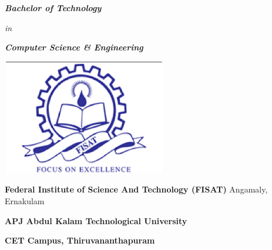 \documentclass[10pt]{article} %
\begin{document}
\noindent 
\vspace{8mm} %
\begin{Center}
       \textbf{\textit{\Large Bachelor of Technology}}\textit{}
\vspace{4mm}


\textit{\normalsize         in}
\vspace{5mm}


\textit{       }\textbf{\textit{\Large Computer Science \& Engineering}}

\vspace{6mm}
\vspace{4mm}
\noindent 



\vspace{8mm}

\includegraphics*[width=2.82in, height=1.98in, keepaspectratio=false, trim=0.00in 0.00in 0.00in 0.02in]{image1}

\vspace{5mm}
\textbf{\Large Federal Institute of Science And Technology (FISAT){\circledR}}
\vspace{4mm}
{\large Angamaly, Ernakulam}

\noindent


\vspace{2mm}

\textbf{\Large APJ Abdul Kalam Technological University}

\noindent \textbf{\Large CET Campus, Thiruvananthapuram}

\textbf{}

\textbf{}

\textbf{}
\end{Center}

\noindent 
\newpage
\end{document}
